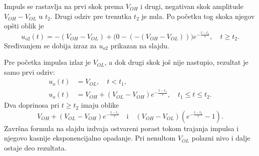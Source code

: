Impuls se rastavlja na prvi skok prema $V_{OH}$ i drugi, negativan skok amplitude $V_{OH}-V_{OL}$ u $t_2$. Drugi odziv pre trenutka $t_2$ je nula. Po početku tog skoka njegov opšti oblik je
\[u_{o2}(t)=-(V_{OH}-V_{OL})+\bigl(0-(-(V_{OH}-V_{OL}))\bigr)e^{-\frac{t-t_2}{\tau}},\quad t\geq t_2.\]
Sređivanjem se dobija izraz za $u_{o2}$ prikazan na slajdu.

Pre početka impulsa izlaz je $V_{OL}$, a dok drugi skok još nije nastupio, rezultat je samo prvi odziv:
\begin{align*}
u_o(t)&=V_{OL},\quad t<t_1,\\
u_o(t)&=V_{OH}+(V_{OL}-V_{OH})e^{-\frac{t-t_1}{\tau}},\quad t_1\leq t\leq t_2.
\end{align*}
Dva doprinosa pri $t\geq t_2$ imaju oblike
\[V_{OH}+(V_{OL}-V_{OH})e^{-\frac{t-t_1}{\tau}}\quad\text{i}\quad (V_{OH}-V_{OL})\left(e^{-\frac{t-t_2}{\tau}}-1\right).\]
Završna formula na slajdu izdvaja ostvareni porast tokom trajanja impulsa i njegovo kasnije eksponencijalno opadanje. Pri nenultom $V_{OL}$ polazni nivo i dalje ostaje deo rezultata.
